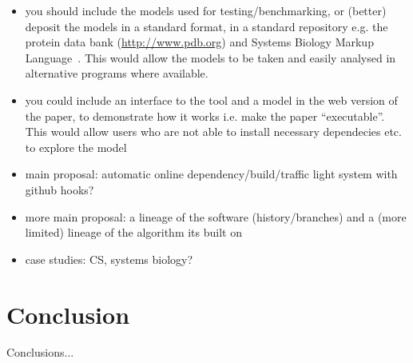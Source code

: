 \documentclass[conference]{IEEEtran}
\begin{document}
\begin{itemize}
\item you should include the models used for testing/benchmarking, or (better) deposit the models in a standard format, in a standard repository e.g. the protein data bank (\url{http://www.pdb.org}) and Systems Biology Markup Language~\cite{Hucka2003,Chaouiya2013}. This would allow the models to be taken and easily analysed in alternative programs where available.
\item you could include an interface to the tool and a model in the web version of the paper, to demonstrate how it works i.e. make the paper ``executable''. This would allow users who are not able to install necessary dependecies etc. to explore the model \cite{Hall2014} 
\item main proposal: automatic online dependency/build/traffic light system with github hooks?
\item more main proposal: a lineage of the software (history/branches) and a (more limited) lineage of the algorithm its built on
\item case studies: CS, systems biology?
\end{itemize}

\section{Conclusion}
Conclusions...



\end{document}

